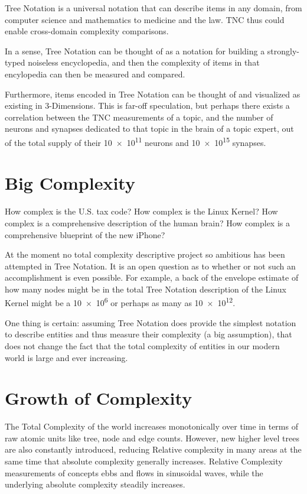 \documentclass[journal]{IEEEtran}
\begin{document}
Tree Notation is a universal notation that can describe items in any domain, from computer science and mathematics to medicine and the law. TNC thus could enable cross-domain complexity comparisons.

In a sense, Tree Notation can be thought of as a notation for building a strongly-typed noiseless encyclopedia, and then the complexity of items in that encylopedia can then be measured and compared.

Furthermore, items encoded in Tree Notation can be thought of and visualized as existing in 3-Dimensions. This is far-off speculation, but perhaps there exists a correlation between the TNC measurements of a topic, and the number of neurons and synapses dedicated to that topic in the brain of a topic expert, out of the total supply of their \num{10e11} neurons and \num{10e15} synapses.

\section{Big Complexity}

How complex is the U.S. tax code? How complex is the Linux Kernel? How complex is a comprehensive description of the human brain? How complex is a comprehensive blueprint of the new iPhone?

At the moment no total complexity descriptive project so ambitious has been attempted in Tree Notation. It is an open question as to whether or not such an accomplishment is even possible. For example, a back of the envelope estimate of how many nodes might be in the total Tree Notation description of the Linux Kernel might be a \num{10e6} or perhaps as many as \num{10e12}.

One thing is certain: assuming Tree Notation does provide the simplest notation to describe entities and thus measure their complexity (a big assumption), that does not change the fact that the total complexity of entities in our modern world is large and ever increasing.

\section{Growth of Complexity}

The Total Complexity of the world increases monotonically over time in terms of raw atomic units like tree, node and edge counts. However, new higher level trees are also constantly introduced, reducing Relative complexity in many areas at the same time that absolute complexity generally increases. Relative Complexity measurements of concepts ebbs and flows in sinusoidal waves, while the underlying absolute complexity steadily increases.
\end{document}

